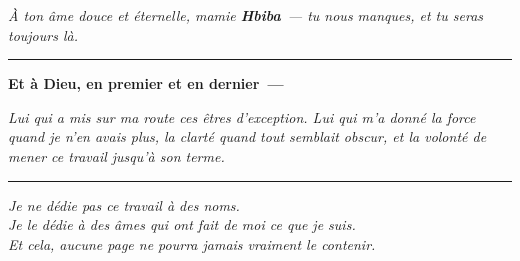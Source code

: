 \begin{center}
\begin{minipage}{0.75\textwidth}
\vspace{0.5cm}

{\footnotesize\itshape À ton âme douce et éternelle, mamie \textbf{Hbiba}~--- tu nous manques, et tu seras toujours là.}
\end{minipage}

\vspace{1cm}
\rule{0.4\textwidth}{0.4pt}
\vspace{1cm}

{\large\bfseries Et à Dieu, en premier et en dernier~---}

\vspace{0.4cm}

\begin{minipage}{0.75\textwidth}
\centering
\itshape
Lui qui a mis sur ma route ces êtres d'exception. Lui qui m'a donné la force
quand je n'en avais plus, la clarté quand tout semblait obscur, et la volonté
de mener ce travail jusqu'à son terme.
\end{minipage}

\vspace{1cm}
\rule{0.4\textwidth}{0.4pt}
\vspace{1cm}

\begin{minipage}{0.75\textwidth}
\centering
\itshape
Je ne dédie pas ce travail à des noms.\\
Je le dédie à des âmes qui ont fait de moi ce que je suis.\\
Et cela, aucune page ne pourra jamais vraiment le contenir.
\end{minipage}

\vspace{1cm}

\end{center}

\newpage
\thispagestyle{empty}

